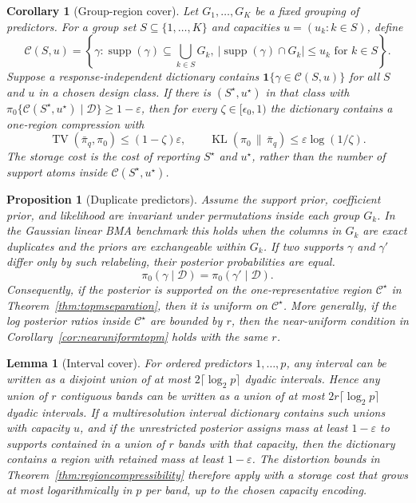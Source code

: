 \documentclass[twoside,11pt]{article}
\newtheorem{lemma}{Lemma}
\newtheorem{proposition}{Proposition}
\newtheorem{corollary}{Corollary}
\newcommand{\D}{\mathcal{D}}
\newcommand{\ind}{\mathbf{1}}
\newcommand{\TV}{\operatorname{TV}}
\newcommand{\KL}{\operatorname{KL}}
\newcommand{\supp}{\operatorname{supp}}
\begin{document}
\begin{corollary}[Group-region cover]
\label{cor:representativecoverage}
Let \(G_1,\dots,G_K\) be a fixed grouping of predictors. For a group set \(S\subseteq\{1,\dots,K\}\) and capacities \(u=(u_k:k\in S)\), define
\[
\mathcal C(S,u) = \left\{\gamma:\supp(\gamma)\subseteq\bigcup_{k\in S}G_k,\ |\supp(\gamma)\cap G_k|\le u_k \text{ for } k\in S\right\}.
\]
Suppose a response-independent dictionary contains \(\ind\{\gamma\in \mathcal C(S,u)\}\) for all \(S\) and \(u\) in a chosen design class. If there is \((S^\star,u^\star)\) in that class with \(\pi_0\{\mathcal C(S^\star,u^\star)\mid\D\}\ge1-\varepsilon\), then for every \(\zeta\in[\epsilon_0,1)\) the dictionary contains a one-region compression with
\[
\TV(\bar\pi_q,\pi_0)\le(1-\zeta)\varepsilon, \qquad \KL(\pi_0\,\|\,\bar\pi_q)\le\varepsilon\log(1/\zeta).
\]
The storage cost is the cost of reporting \(S^\star\) and \(u^\star\), rather than the number of support atoms inside \(\mathcal C(S^\star,u^\star)\).
\end{corollary}

\begin{proposition}[Duplicate predictors]
\label{prop:duplicatepredictors}
Assume the support prior, coefficient prior, and likelihood are invariant under permutations inside each group \(G_k\). In the Gaussian linear BMA benchmark this holds when the columns in \(G_k\) are exact duplicates and the priors are exchangeable within \(G_k\). If two supports \(\gamma\) and \(\gamma'\) differ only by such relabeling, their posterior probabilities are equal.
\[
\pi_0(\gamma\mid\D)=\pi_0(\gamma'\mid\D).
\]
Consequently, if the posterior is supported on the one-representative region \(\mathcal C^\star\) in Theorem~\ref{thm:topmseparation}, then it is uniform on \(\mathcal C^\star\). More generally, if the log posterior ratios inside \(\mathcal C^\star\) are bounded by \(r\), then the near-uniform condition in Corollary~\ref{cor:nearuniformtopm} holds with the same \(r\).
\end{proposition}

\begin{lemma}[Interval cover]
\label{lem:intervalcoverage}
For ordered predictors \(1,\dots,p\), any interval can be written as a disjoint union of at most \(2\lceil\log_2 p\rceil\) dyadic intervals. Hence any union of \(r\) contiguous bands can be written as a union of at most \(2r\lceil\log_2 p\rceil\) dyadic intervals. If a multiresolution interval dictionary contains such unions with capacity \(u\), and if the unrestricted posterior assigns mass at least \(1-\varepsilon\) to supports contained in a union of \(r\) bands with that capacity, then the dictionary contains a region with retained mass at least \(1-\varepsilon\). The distortion bounds in Theorem~\ref{thm:regioncompressibility} therefore apply with a storage cost that grows at most logarithmically in \(p\) per band, up to the chosen capacity encoding.
\end{lemma}
\end{document}
